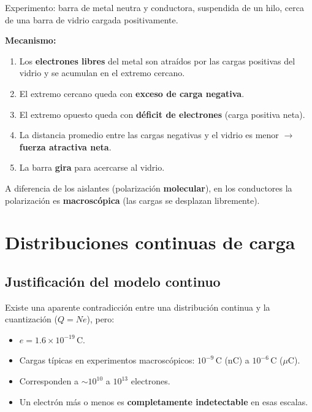 \documentclass[12pt,a4paper]{article}
\begin{document}
Experimento: barra de metal neutra y conductora, suspendida de un hilo,
cerca de una barra de vidrio cargada positivamente.

\textbf{Mecanismo:}
\begin{enumerate}[nosep]
  \item Los \textbf{electrones libres} del metal son atraídos por las
        cargas positivas del vidrio y se acumulan en el extremo cercano.
  \item El extremo cercano queda con \textbf{exceso de carga negativa}.
  \item El extremo opuesto queda con \textbf{déficit de electrones}
        (carga positiva neta).
  \item La distancia promedio entre las cargas negativas y el vidrio es
        menor $\to$ \textbf{fuerza atractiva neta}.
  \item La barra \textbf{gira} para acercarse al vidrio.
\end{enumerate}

A diferencia de los aislantes (polarización \textbf{molecular}), en los
conductores la polarización es \textbf{macroscópica} (las cargas se
desplazan libremente).

\section{Distribuciones continuas de carga}

\subsection{Justificación del modelo continuo}

Existe una aparente contradicción entre una distribución continua y la
cuantización ($Q = N e$), pero:

\begin{itemize}[nosep]
  \item $e = 1.6 \times 10^{-19}$\,C.
  \item Cargas típicas en experimentos macroscópicos: $10^{-9}$\,C
        (nC) a $10^{-6}$\,C ($\mu$C).
  \item Corresponden a $\sim 10^{10}$ a $10^{13}$ electrones.
  \item Un electrón más o menos es \textbf{completamente indetectable}
        en esas escalas.
\end{itemize}
\end{document}
